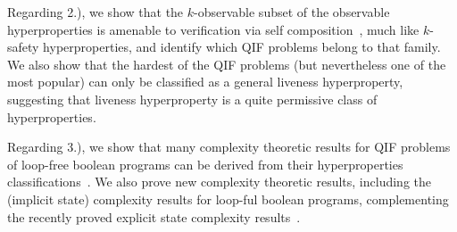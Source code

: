 \documentclass[]{eptcs}
\begin{document}
Regarding 2.), we show that the $k$-observable subset of the
observable hyperproperties is amenable to verification via self
composition~\cite{barthe:csfw04,darvas:spc05,terauchi:sas05,naumann:esorics06,unno:plas2006},
much like $k$-safety hyperproperties, and identify which QIF problems
belong to that family.  We also show that the hardest of the QIF
problems (but nevertheless one of the most popular) can only be
classified as a general liveness hyperproperty, suggesting that
liveness hyperproperty is a quite permissive class of hyperproperties.

Regarding 3.), we show that many complexity theoretic results for QIF
problems of loop-free boolean programs can be derived from their
hyperproperties
classifications~\cite{DBLP:conf/csfw/YasuokaT10,DBLP:conf/esorics/YasuokaT10}.
We also prove new complexity theoretic results, including the
(implicit state) complexity results for loop-ful boolean programs,
complementing the recently proved explicit state complexity
results~\cite{DBLP:conf/csfw/CernyCH11}.
\end{document}
